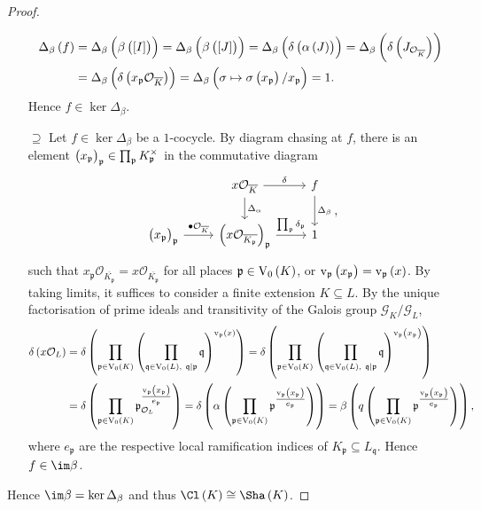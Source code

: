 \documentclass{article}
\newcommand{\br}{\del}                              %
\newcommand{\GGG}{\mathcal{G}} %
\newcommand{\OOO}{\mathcal{O}} %
\newcommand{\ppp}{\mathfrak{p}}   %
\newcommand{\qqq}{\mathfrak{q}}   %
\newcommand{\V}{\mathrm{V}}   %
\renewcommand{\v}{\mathrm{v}} %
\begin{document}
\begin{proof}
\begin{itemize}
\begin{align*}
\Delta_\beta\br{f}
& = \Delta_\beta\br{\beta\br{\sbr{I}}}
= \Delta_\beta\br{\beta\br{\sbr{J}}}
= \Delta_\beta\br{\delta\br{\alpha\br{J}}}
= \Delta_\beta\br{\delta\br{J_{\OOO_{\overline{K}}}}} \\
& = \Delta_\beta\br{\delta\br{x_\ppp\OOO_{\overline{K}}}}
= \Delta_\beta\br{\sigma \mapsto \sigma\br{x_\ppp} / x_\ppp}
= 1.
\end{align*}
Hence $ f \in \ker \Delta_\beta $.
\item[$ \supseteq $] Let $ f \in \ker \Delta_\beta $ be a $ 1 $-cocycle. By diagram chasing at $ f $, there is an element $ \br{x_\ppp}_\ppp \in \prod_\ppp K_\ppp^\times $ in the commutative diagram
$$
\begin{tikzcd}
& x\OOO_{\overline{K}} \arrow{r}{\delta} \arrow{d}{\Delta_\alpha} & f \arrow{d}{\Delta_\beta} \\
\br{x_\ppp}_\ppp \arrow{r}{\bullet \OOO_{\overline{K}}} & \br{x\OOO_{\overline{K_\ppp}}}_\ppp \arrow{r}{\prod_\ppp \delta_\ppp} & 1
\end{tikzcd},
$$
such that $ x_\ppp\OOO_{\overline{K_\ppp}} = x\OOO_{\overline{K_\ppp}} $ for all places $ \ppp \in \V_0\br{K} $, or $ \v_\ppp\br{x_\ppp} = \v_\ppp\br{x} $. By taking limits, it suffices to consider a finite extension $ K \subseteq L $. By the unique factorisation of prime ideals and transitivity of the Galois group $ \GGG_K / \GGG_L $,
\begin{align*}
\delta\br{x\OOO_L}
& = \delta\br{\prod_{\ppp \in \V_0\br{K}} \br{\prod_{\qqq \in \V_0\br{L}, \ \qqq \mid \ppp} \qqq}^{\v_\ppp\br{x}}}
= \delta\br{\prod_{\ppp \in \V_0\br{K}} \br{\prod_{\qqq \in \V_0\br{L}, \ \qqq \mid \ppp} \qqq}^{\v_\ppp\br{x_\ppp}}} \\
& = \delta\br{\prod_{\ppp \in \V_0\br{K}} \ppp_{\OOO_L}^{\tfrac{\v_\ppp\br{x_\ppp}}{e_\ppp}}}
= \delta\br{\alpha\br{\prod_{\ppp \in \V_0\br{K}} \ppp^{\tfrac{\v_\ppp\br{x_\ppp}}{e_\ppp}}}}
= \beta\br{q\br{\prod_{\ppp \in \V_0\br{K}} \ppp^{\tfrac{\v_\ppp\br{x_\ppp}}{e_\ppp}}}},
\end{align*}
where $ e_\ppp $ are the respective local ramification indices of $ K_\ppp \subseteq L_\qqq $. Hence $ f \in \im \beta $.
\end{itemize}
Hence $ \im \beta = \ker \Delta_\beta $ and thus $ \Cl\br{K} \cong \Sha\br{K} $.
\end{proof}
\end{document}

